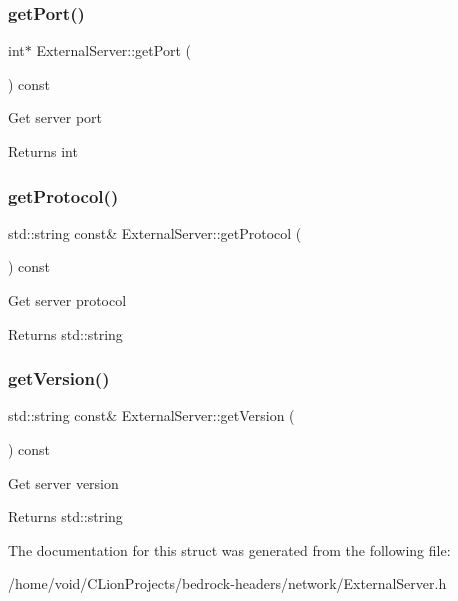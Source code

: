 \subsubsection{\texorpdfstring{getPort()}{getPort()}}
{\footnotesize\ttfamily int$\ast$ External\+Server\+::get\+Port (\begin{DoxyParamCaption}{ }\end{DoxyParamCaption}) const}

Get server port \begin{DoxyReturn}{Returns}
int 
\end{DoxyReturn}
\mbox{\label{struct_external_server_ada8686e546e38af4c6e1e978f2f659d5}} 
\subsubsection{\texorpdfstring{getProtocol()}{getProtocol()}}
{\footnotesize\ttfamily std\+::string const\& External\+Server\+::get\+Protocol (\begin{DoxyParamCaption}{ }\end{DoxyParamCaption}) const}

Get server protocol \begin{DoxyReturn}{Returns}
std\+::string 
\end{DoxyReturn}
\mbox{\label{struct_external_server_ae0f3924b06684ee49915ca02d3378db2}} 
\subsubsection{\texorpdfstring{getVersion()}{getVersion()}}
{\footnotesize\ttfamily std\+::string const\& External\+Server\+::get\+Version (\begin{DoxyParamCaption}{ }\end{DoxyParamCaption}) const}

Get server version \begin{DoxyReturn}{Returns}
std\+::string 
\end{DoxyReturn}


The documentation for this struct was generated from the following file\+:\begin{DoxyCompactItemize}
\item 
/home/void/\+C\+Lion\+Projects/bedrock-\/headers/network/External\+Server.\+h\end{DoxyCompactItemize}
